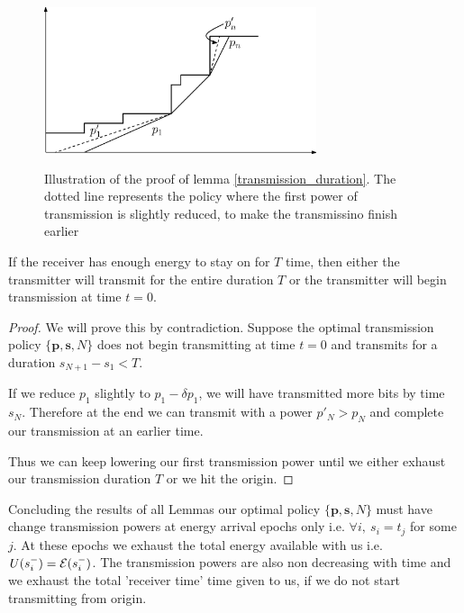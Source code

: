 
\begin{figure}
\label{lemma4}
\centering
  \centerline{\includegraphics[width=8cm,height=50mm]{Lemma4.eps}}
\caption{Illustration of the proof of lemma \ref{transmission_duration}. The dotted line represents the policy where the first power of transmission is slightly reduced, to make the transmissino finish earlier}
\end{figure}

\begin{lemma}
If the receiver has enough energy to stay on for $T$ time, then either the transmitter will transmit for the entire duration $T$ or the transmitter will begin transmission at time $t=0$.
\label{transmission_duration}
\end{lemma}
\begin{proof}
We will prove this by contradiction. Suppose the optimal transmission policy $\{\textbf{p},\textbf{s},N\}$ does not begin transmitting at time $t=0$ and transmits for a duration $s_{N+1}-s_1 < T$.

If we reduce $p_1$ slightly to $p_1-\delta p_1$, we will have transmitted more bits by time $s_N$. Therefore at the end we can transmit with a power $p'_N > p_N$ and complete our transmission at an earlier time.

Thus we can keep lowering our first transmission power until we either exhaust our transmission duration $T$ or we hit the origin.
\end{proof}

Concluding the results of all Lemmas our optimal policy $\{\textbf{p},\textbf{s},N\}$ must have change transmission powers at energy arrival epochs only i.e. $\forall i,\ s_i=t_j$ for some $j$. At these epochs we exhaust the total energy available with us i.e. $U(s_i^-)=\mathcal{E}(s_i^-)$. The transmission powers are also non decreasing with time and we exhaust the total 'receiver time' time given to us, if we do not start transmitting from origin.

